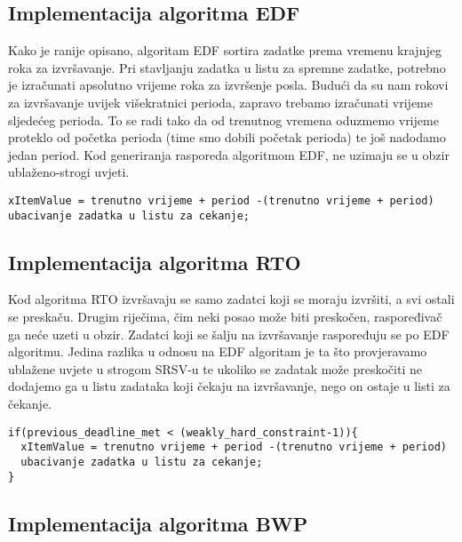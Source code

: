 \documentclass[../zavrsni.tex]{subfiles}
\begin{document}
\subsection{Implementacija algoritma EDF}

Kako je ranije opisano, algoritam EDF sortira zadatke prema vremenu krajnjeg roka za izvršavanje. Pri stavljanju zadatka u 
listu za spremne zadatke, potrebno je izračunati apsolutno vrijeme roka za izvršenje posla. Budući da su nam rokovi za izvršavanje
uvijek višekratnici perioda, zapravo trebamo izračunati vrijeme sljedećeg perioda. To se radi tako da od trenutnog vremena 
oduzmemo vrijeme proteklo od početka perioda (time smo dobili početak perioda) te još nadodamo jedan period. 
Kod generiranja rasporeda algoritmom EDF, ne uzimaju se u obzir ublaženo-strogi uvjeti.

\begin{lstlisting}[style=CStyle,caption={Pseudokod implementacije algoritma EDF},captionpos=b]
xItemValue = trenutno vrijeme + period -(trenutno vrijeme + period)
ubacivanje zadatka u listu za cekanje;
\end{lstlisting}


\subsection{Implementacija algoritma RTO}

Kod algoritma RTO izvršavaju se samo zadatci koji se moraju izvršiti, a svi ostali se preskaču. Drugim riječima, čim neki posao 
može biti preskočen, raspoređivač ga neće uzeti u obzir. Zadatci koji se šalju na izvršavanje raspoređuju se po EDF algoritmu. Jedina razlika u odnosu
na EDF algoritam je ta što provjeravamo ublažene uvjete u strogom SRSV-u te ukoliko se zadatak može preskočiti ne dodajemo ga u 
listu zadataka koji čekaju na izvršavanje, nego on ostaje u listi za čekanje. 

\begin{lstlisting}[style=CStyle,caption={Pseudokod implementacije algoritma RTO},captionpos=b]
if(previous_deadline_met < (weakly_hard_constraint-1)){
  xItemValue = trenutno vrijeme + period -(trenutno vrijeme + period)
  ubacivanje zadatka u listu za cekanje;
}
\end{lstlisting}

\subsection{Implementacija algoritma BWP}
\end{document}
